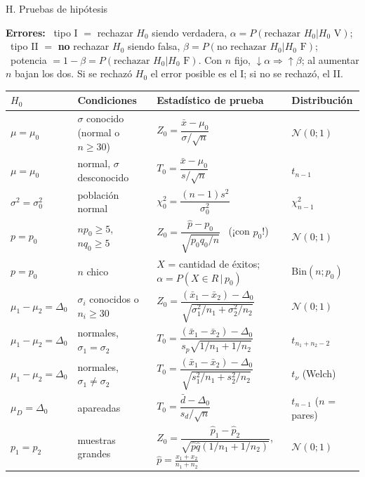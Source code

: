 \documentclass[10pt,a4paper]{extarticle}
\newcommand{\Nor}{\mathcal{N}}
\newcommand{\xb}{\bar{x}}
\newcommand{\chis}{\chi^2}
\newcommand{\sq}[1]{\sqrt{#1}}
\begin{document}
\newpage
\begin{hoja}{H. Pruebas de hipótesis}
\raggedright
\textbf{Errores:} \ tipo I $=$ rechazar $H_0$ siendo verdadera, $\alpha=P(\text{rechazar }H_0|H_0\text{ V})$; \ tipo II $=$ \textbf{no} rechazar $H_0$ siendo falsa, $\beta=P(\text{no rechazar }H_0|H_0\text{ F})$; \ potencia $=1-\beta=P(\text{rechazar }H_0|H_0\text{ F})$. Con $n$ fijo, $\downarrow\alpha\Rightarrow\uparrow\beta$; al aumentar $n$ bajan los dos. Si se rechazó $H_0$ el error posible es el I; si no se rechazó, el II.\\[2pt]
\renewcommand{\arraystretch}{1.6}
\begin{tabular}{@{}>{\raggedright\arraybackslash}p{2.5cm}>{\raggedright\arraybackslash}p{4.7cm}>{\raggedright\arraybackslash}p{6.6cm}>{\raggedright\arraybackslash}p{3.0cm}@{}}
\toprule
\textbf{$H_0$} & \textbf{Condiciones} & \textbf{Estadístico de prueba} & \textbf{Distribución}\\\midrule
$\mu=\mu_0$ & $\sigma$ conocido (normal o $n\ge30$) & $Z_0=\dfrac{\xb-\mu_0}{\sigma/\sq n}$ & $\Nor(0;1)$\\
$\mu=\mu_0$ & normal, $\sigma$ desconocido & $T_0=\dfrac{\xb-\mu_0}{s/\sq n}$ & $t_{n-1}$\\
$\sigma^2=\sigma_0^2$ & población normal & $\chis_0=\dfrac{(n-1)s^2}{\sigma_0^2}$ & $\chis_{n-1}$\\
$p=p_0$ & $np_0\ge5$, $nq_0\ge5$ & $Z_0=\dfrac{\hat p-p_0}{\sq{p_0q_0/n}}$ \ (¡con $p_0$!) & $\Nor(0;1)$\\
$p=p_0$ & $n$ chico & $X$ = cantidad de éxitos; $\alpha=P(X\in R\,|\,p_0)$ & $\mathrm{Bin}(n;p_0)$\\
$\mu_1-\mu_2=\Delta_0$ & $\sigma_i$ conocidos o $n_i\ge30$ & $Z_0=\dfrac{(\xb_1-\xb_2)-\Delta_0}{\sq{\sigma_1^2/n_1+\sigma_2^2/n_2}}$ & $\Nor(0;1)$\\
$\mu_1-\mu_2=\Delta_0$ & normales, $\sigma_1=\sigma_2$ & $T_0=\dfrac{(\xb_1-\xb_2)-\Delta_0}{s_p\sq{1/n_1+1/n_2}}$ & $t_{n_1+n_2-2}$\\
$\mu_1-\mu_2=\Delta_0$ & normales, $\sigma_1\ne\sigma_2$ & $T_0=\dfrac{(\xb_1-\xb_2)-\Delta_0}{\sq{s_1^2/n_1+s_2^2/n_2}}$ & $t_\nu$ (Welch)\\
$\mu_D=\Delta_0$ & apareadas & $T_0=\dfrac{\bar d-\Delta_0}{s_d/\sq n}$ & $t_{n-1}$ ($n$ = pares)\\
$p_1=p_2$ & muestras grandes & $Z_0=\dfrac{\hat p_1-\hat p_2}{\sq{\hat p\hat q(1/n_1+1/n_2)}}$, \ $\hat p=\frac{x_1+x_2}{n_1+n_2}$ & $\Nor(0;1)$\\
\bottomrule
\end{tabular}


\end{hoja}
\end{document}
